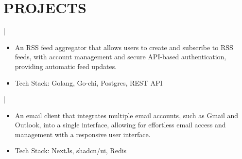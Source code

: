 \documentclass[]{resume}
\begin{document}
\section{PROJECTS}
 | \href{https://github.com/saswatax/rss-aggregator}{\faGithub}
\begin{itemize}
  \item An RSS feed aggregator that allows users to create and subscribe to RSS feeds, with account management and secure API-based authentication, providing automatic feed updates.
  \item Tech Stack: Golang, Go-chi, Postgres, REST API
\end{itemize}
 | \href{https://github.com/saswatax/email-client}{\faGithub}
\begin{itemize}
  \item An email client that integrates multiple email accounts, such as Gmail and Outlook, into a single interface, allowing for effortless email access and management with a responsive user interface.
  \item Tech Stack: NextJs, shadcn/ui, Redis
\end{itemize}
\end{document}
